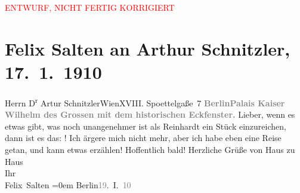 
\begin{center}
            \textcolor{red}{ENTWURF, NICHT FERTIG KORRIGIERT}
                      \end{center}
            
         
         \renewcommand{\erwaehntePersonen}{Personen: Max Reinhardt}
         \renewcommand{\erwaehnteOrte}{Orte: Altes Palais, Berlin, Edmund-Weiß-Gasse, Wien}
         \renewcommand{\erwaehnteWerke}{}
               \section[Felix Salten an Arthur Schnitzler, 17. 1. 1910]{ Felix Salten an Arthur Schnitzler, 17. 1. 1910}\nopagebreak{}\rehead{ }\begin{ledgroupsized}[t]{13cm}\normalsize\beginnumbering \toendnotes[C]{\smallbreak\pagebreak[2]} 
\toendnotes[C]{\smallbreak}\pstart{}{\pb} Herrn D\textsuperscript{r} Artur Schnitzler\pend{}\pstart{}Wien\pend{}\pstart{}XVIII. Spoettelgaße 7\pend{}{\bigskip}\pstart
           \noindent{}{\pb}\textcolor{gray}{\textbf{\textbf{Berlin}}}\hfill \textcolor{gray}{\textbf{Palais Kaiser Wilhelm des Grossen mit dem
                        historischen Eckfenster.}}\pend
           \pstart
           {\pb}Lieber, wenn
               es etwas gibt, was noch unangenehmer ist als Reinhardt
               ein Stück einzureichen, dann ist es das: \label{K_L03545-1v}\label{K_L03545-1h}! Ich ärgere mich
               nicht mehr, aber ich habe eben eine Reise getan, und kann etwas erzählen!\pend
           \pstart
           Hoffentlich bald! Herzliche Grüße von Haus zu Haus{\\[\baselineskip]} Ihr{\\[\baselineskip]}\spacefill\mbox{Felix Salten}\pend
           \leftskip=0em{}\pstart
           Berlin\textcolor{gray}{19}. I. \textcolor{gray}{10}\pend
           

\end{ledgroupsized}

